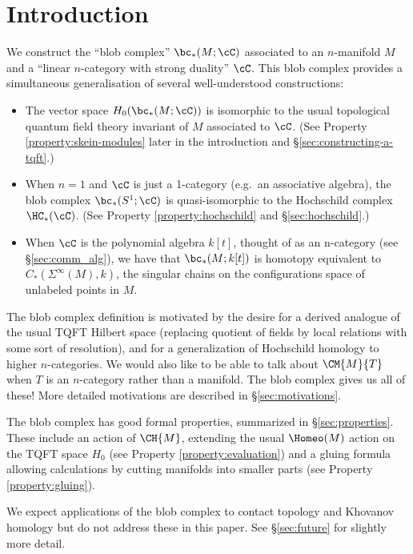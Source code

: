 
\section{Introduction}

We construct the ``blob complex'' $\bc_*(M; \cC)$ associated to an $n$-manifold $M$ and a ``linear $n$-category with strong duality'' $\cC$. This blob complex provides a simultaneous generalisation of several well-understood constructions:
\begin{itemize}
\item The vector space $H_0(\bc_*(M; \cC))$ is isomorphic to the usual topological quantum field theory invariant of $M$ associated to $\cC$. (See Property \ref{property:skein-modules} later in the introduction and \S \ref{sec:constructing-a-tqft}.)
\item When $n=1$ and $\cC$ is just a 1-category (e.g.\ an associative algebra), the blob complex $\bc_*(S^1; \cC)$ is quasi-isomorphic to the Hochschild complex $\HC_*(\cC)$. (See Property \ref{property:hochschild} and \S \ref{sec:hochschild}.)
\item When $\cC$ is the polynomial algebra $k[t]$, thought of as an n-category (see \S \ref{sec:comm_alg}), we have 
that $\bc_*(M; k[t])$ is homotopy equivalent to $C_*(\Sigma^\infty(M), k)$, the singular chains
on the configurations space of unlabeled points in $M$.
\end{itemize}
The blob complex definition is motivated by the desire for a derived analogue of the usual TQFT Hilbert space (replacing quotient of fields by local relations with some sort of resolution), 
and for a generalization of Hochschild homology to higher $n$-categories. We would also like to be able to talk about $\CM{M}{T}$ when $T$ is an $n$-category rather than a manifold. The blob complex gives us all of these! More detailed motivations are described in \S \ref{sec:motivations}.

The blob complex has good formal properties, summarized in \S \ref{sec:properties}. These include an action of $\CH{M}$, 
extending the usual $\Homeo(M)$ action on the TQFT space $H_0$ (see Property \ref{property:evaluation}) and a gluing formula allowing calculations by cutting manifolds into smaller parts (see Property \ref{property:gluing}).

We expect applications of the blob complex to contact topology and Khovanov homology but do not address these in this paper. See \S \ref{sec:future} for slightly more detail.

